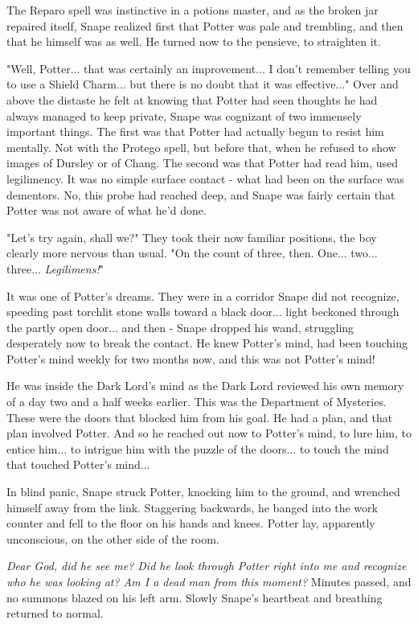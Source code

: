 \documentclass[a4paper,11pt]{article}
\begin{document}
The Reparo spell was instinctive in a potions master, and as the broken jar repaired itself, Snape realized first that Potter was pale and trembling, and then that he himself was as well. He turned now to the pensieve, to straighten it.

"Well, Potter... that was certainly an improvement... I don't remember telling you to use a Shield Charm... but there is no doubt that it was effective..." Over and above the distaste he felt at knowing that Potter had seen thoughts he had always managed to keep private, Snape was cognizant of two immensely important things. The first was that Potter had actually begun to resist him mentally. Not with the Protego spell, but before that, when he refused to show images of Dursley or of Chang. The second was that Potter had read him, used legilimency. It was no simple surface contact - what had been on the surface was dementors. No, this probe had reached deep, and Snape was fairly certain that Potter was not aware of what he'd done.

"Let's try again, shall we?" They took their now familiar positions, the boy clearly more nervous than usual. "On the count of three, then. One... two... three... \emph{Legilimens!}"

It was one of Potter's dreams. They were in a corridor Snape did not recognize, speeding past torchlit stone walls toward a black door... light beckoned through the partly open door... and then - Snape dropped his wand, struggling desperately now to break the contact. He knew Potter's mind, had been touching Potter's mind weekly for two months now, and this was not Potter's mind!

He was inside the Dark Lord's mind as the Dark Lord reviewed his own memory of a day two and a half weeks earlier. This was the Department of Mysteries. These were the doors that blocked him from his goal. He had a plan, and that plan involved Potter. And so he reached out now to Potter's mind, to lure him, to entice him... to intrigue him with the puzzle of the doors... to touch the mind that touched Potter's mind...

In blind panic, Snape struck Potter, knocking him to the ground, and wrenched himself away from the link. Staggering backwards, he banged into the work counter and fell to the floor on his hands and knees. Potter lay, apparently unconscious, on the other side of the room.

\emph{Dear God, did he see me? Did he look through Potter right into me and recognize who he was looking at? Am I a dead man from this moment?} Minutes passed, and no summons blazed on his left arm. Slowly Snape's heartbeat and breathing returned to normal.
\end{document}
